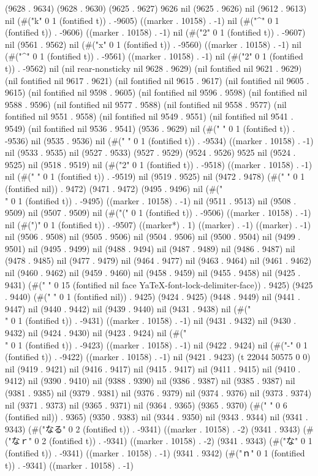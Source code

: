 {(9628 . 9634) (9628 . 9630) (9625 . 9627) 9626 nil (9625 . 9626) nil (9612 . 9613) nil (#("k" 0 1 (fontified t)) . -9605) ((marker . 10158) . -1) nil (#("^" 0 1 (fontified t)) . -9606) ((marker . 10158) . -1) nil (#("2" 0 1 (fontified t)) . -9607) nil (9561 . 9562) nil (#("x" 0 1 (fontified t)) . -9560) ((marker . 10158) . -1) nil (#("^" 0 1 (fontified t)) . -9561) ((marker . 10158) . -1) nil (#("2" 0 1 (fontified t)) . -9562) nil (nil rear-nonsticky nil 9628 . 9629) (nil fontified nil 9621 . 9629) (nil fontified nil 9617 . 9621) (nil fontified nil 9615 . 9617) (nil fontified nil 9605 . 9615) (nil fontified nil 9598 . 9605) (nil fontified nil 9596 . 9598) (nil fontified nil 9588 . 9596) (nil fontified nil 9577 . 9588) (nil fontified nil 9558 . 9577) (nil fontified nil 9551 . 9558) (nil fontified nil 9549 . 9551) (nil fontified nil 9541 . 9549) (nil fontified nil 9536 . 9541) (9536 . 9629) nil (#(" " 0 1 (fontified t)) . -9536) nil (9535 . 9536) nil (#(" " 0 1 (fontified t)) . -9534) ((marker . 10158) . -1) nil (9533 . 9535) nil (9527 . 9533) (9527 . 9529) (9524 . 9526) 9525 nil (9524 . 9525) nil (9518 . 9519) nil (#("2" 0 1 (fontified t)) . -9518) ((marker . 10158) . -1) nil (#(" " 0 1 (fontified t)) . -9519) nil (9519 . 9525) nil (9472 . 9478) (#(" " 0 1 (fontified nil)) . 9472) (9471 . 9472) (9495 . 9496) nil (#("\\" 0 1 (fontified t)) . -9495) ((marker . 10158) . -1) nil (9511 . 9513) nil (9508 . 9509) nil (9507 . 9509) nil (#("(" 0 1 (fontified t)) . -9506) ((marker . 10158) . -1) nil (#(")" 0 1 (fontified t)) . -9507) ((marker*) . 1) ((marker) . -1) ((marker) . -1) nil (9506 . 9508) nil (9505 . 9506) nil (9504 . 9506) nil (9500 . 9504) nil (9499 . 9501) nil (9495 . 9499) nil (9488 . 9494) nil (9487 . 9489) nil (9486 . 9487) nil (9478 . 9485) nil (9477 . 9479) nil (9464 . 9477) nil (9463 . 9464) nil (9461 . 9462) nil (9460 . 9462) nil (9459 . 9460) nil (9458 . 9459) nil (9455 . 9458) nil (9425 . 9431) (#("               " 0 15 (fontified nil face YaTeX-font-lock-delimiter-face)) . 9425) (9425 . 9440) (#(" " 0 1 (fontified nil)) . 9425) (9424 . 9425) (9448 . 9449) nil (9441 . 9447) nil (9440 . 9442) nil (9439 . 9440) nil (9431 . 9438) nil (#("\\" 0 1 (fontified t)) . -9431) ((marker . 10158) . -1) nil (9431 . 9432) nil (9430 . 9432) nil (9424 . 9430) nil (9423 . 9424) nil (#("\\" 0 1 (fontified t)) . -9423) ((marker . 10158) . -1) nil (9422 . 9424) nil (#("-" 0 1 (fontified t)) . -9422) ((marker . 10158) . -1) nil (9421 . 9423) (t 22044 50575 0 0) nil (9419 . 9421) nil (9416 . 9417) nil (9415 . 9417) nil (9411 . 9415) nil (9410 . 9412) nil (9390 . 9410) nil (9388 . 9390) nil (9386 . 9387) nil (9385 . 9387) nil (9381 . 9385) nil (9379 . 9381) nil (9376 . 9379) nil (9374 . 9376) nil (9373 . 9374) nil (9371 . 9373) nil (9365 . 9371) nil (9364 . 9365) (9365 . 9370) (#("	     " 0 6 (fontified nil)) . 9365) (9350 . 9383) nil (9344 . 9350) nil (9343 . 9344) nil (9341 . 9343) (#("なる" 0 2 (fontified t)) . -9341) ((marker . 10158) . -2) (9341 . 9343) (#("なｒ" 0 2 (fontified t)) . -9341) ((marker . 10158) . -2) (9341 . 9343) (#("な" 0 1 (fontified t)) . -9341) ((marker . 10158) . -1) (9341 . 9342) (#("ｎ" 0 1 (fontified t)) . -9341) ((marker . 10158) . -1) }
